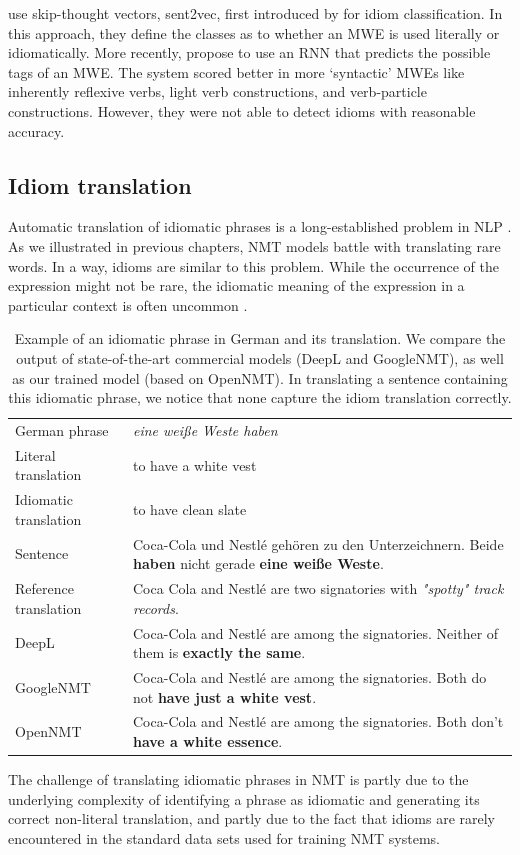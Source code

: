  \citet{salton-etal-2016-idiom} use skip-thought vectors, sent2vec, first introduced by \citet{NIPS2015_5950} for idiom classification. 
 In this approach, they define the classes as to whether an MWE is used literally or idiomatically. 
More recently, \citet{klyueva-etal-2017-neural} propose to use an RNN that predicts the possible tags of an MWE. 
The system scored better in more `syntactic' MWEs like inherently reflexive verbs, light verb constructions, and verb-particle constructions.
However, they were not able to detect idioms with reasonable accuracy.

\subsection{Idiom translation}

Automatic translation of idiomatic phrases is a long-established problem in NLP \citep{Schenk:1986:IRM:991365.991458}.
As we illustrated in previous chapters, NMT models battle with translating rare words.
In a way, idioms are similar to this problem. 
While the occurrence of the expression might not be rare, the idiomatic meaning of the expression in a particular context is often uncommon \citep{salton-etal-2014-evaluation,isabelle2017challenge,agrawal-etal-2018-beating}. 
%
%
\begin{table}[htb!]
\centering
\small
\caption{Example of an idiomatic phrase in German and its translation. We compare the output of state-of-the-art commercial models (DeepL and GoogleNMT), as well as our trained model (based on OpenNMT). In translating a sentence containing this idiomatic phrase, we notice that none capture the idiom translation correctly. \label{examplesinc}}
\begin{tabularx}{0.8\linewidth}{p{2.7cm} X}
 \toprule
German phrase & \textit{eine wei{\ss}e Weste haben}  \\
 Literal translation & to have a white vest \\
 Idiomatic translation  &  to have clean slate  \\
	\midrule
 Sentence & Coca-Cola und Nestl{\'e} geh{\"o}ren zu den Unterzeichnern. Beide \textbf{haben} nicht gerade \textbf{eine wei{\ss}e Weste}. \\
  Reference translation & Coca Cola and Nestl{\'e} are two signatories with \textit{"spotty" track records}.\\
  \midrule
 DeepL   & Coca-Cola and Nestl{\'e} are among the signatories. Neither of them is \textbf{exactly the same}.  \\
GoogleNMT  & Coca-Cola and Nestl{\'e} are among the signatories. Both do not \textbf{have just a white vest}.  \\
OpenNMT & Coca-Cola and Nestl{\'e} are among the signatories. Both don't \textbf{have a white essence}.  \\
\bottomrule
\end{tabularx}
\end{table}
%
The challenge of translating idiomatic phrases in NMT is partly due
to the underlying complexity of identifying a phrase as idiomatic and generating its correct non-literal translation, and partly due
to the fact that idioms are rarely encountered in the standard data sets used for training NMT systems. 


